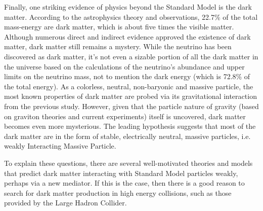 \par Finally, one striking evidence of physics beyond the Standard Model is the dark matter. According to the astrophysics theory and observations, 22.7\% of the total mass-energy are dark matter, which is about five times the visible matter. Although numerous direct and indirect evidence approved the existence of dark matter, dark matter still remains a mystery. While the neutrino has been discovered as dark matter, it's not even a sizable portion of all the dark matter in the universe based on the calculations of the neutrino's abundance and upper limits on the neutrino mass, not to mention the dark energy (which is 72.8\% of the total energy). As a colorless, neutral, non-baryonic and massive particle, the most known properties of dark matter are probed via its gravitational interaction from the previous study. However, given that the particle nature of gravity (based on graviton theories and current experiments) itself is uncovered, dark matter becomes even more mysterious. The leading hypothesis suggests that most of the dark matter are in the form of stable, electrically neutral, massive particles, i.e. weakly Interacting Massive Particle.

\par To explain these questions, there are several well-motivated theories and models that predict dark matter interacting with Standard Model particles weakly, perhaps via a new mediator. If this is the case, then there is a good reason to search for dark matter production in high energy collisions, such as those provided by the Large Hadron Collider.

